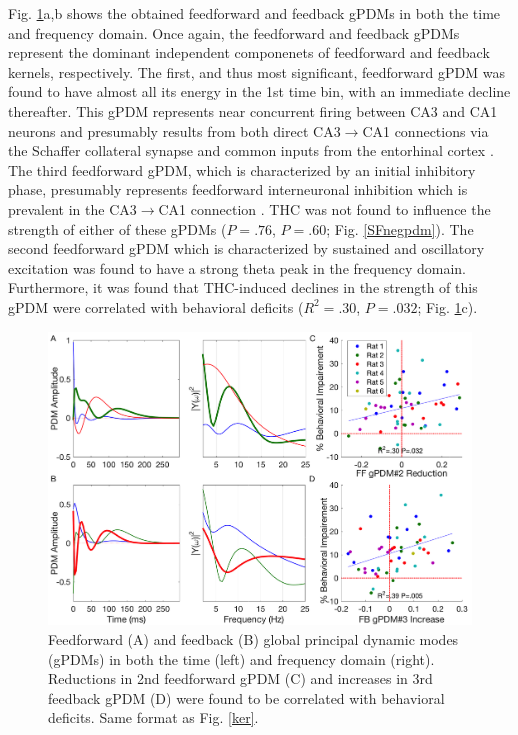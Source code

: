 \documentclass[11pt,a4paper,final]{article}
\begin{document}
Fig. \ref{pdm}a,b shows the obtained feedforward and feedback gPDMs in both the time and frequency domain.
Once again, the feedforward and feedback gPDMs represent the dominant independent componenets of feedforward and feedback kernels, respectively.
The first, and thus most significant, feedforward gPDM was found to have almost all its energy in the 1st time bin, with an immediate decline thereafter.
This gPDM represents near concurrent firing between CA3 and CA1 neurons and presumably results from both direct CA3$\to$CA1 connections via the Schaffer collateral synapse \citep{deadwyler75,sandler15clpp} and common inputs from the entorhinal cortex \citep{jones93,mehta09}.
The third feedforward gPDM, which is characterized by an initial inhibitory phase, presumably represents feedforward interneuronal inhibition which is prevalent in the CA3$\to$CA1 connection \citep{pouille01,zemankovics13}.
THC was not found to influence the strength of either of these gPDMs ($P=.76$, $P=.60$; Fig. \ref{SFnegpdm}).
The second feedforward gPDM which is characterized by sustained and oscillatory excitation was found to have a strong theta peak in the frequency domain.
Furthermore, it was found that THC-induced declines in the strength of this gPDM were correlated with behavioral deficits ($R^2=.30$, $P=.032$; Fig. \ref{pdm}c).

\begin{figure}[!ht]
\centering
\includegraphics[width=130mm]{pdm}
\caption[PDM Analysis]{
Feedforward (A) and feedback (B) global principal dynamic modes (gPDMs) in both the time (left) and frequency domain (right).
Reductions in 2nd feedforward gPDM (C) and increases in 3rd feedback gPDM (D) were found to be correlated with behavioral deficits. Same format as Fig. \ref{ker}.}
\label{pdm}
\end{figure}
\end{document}
